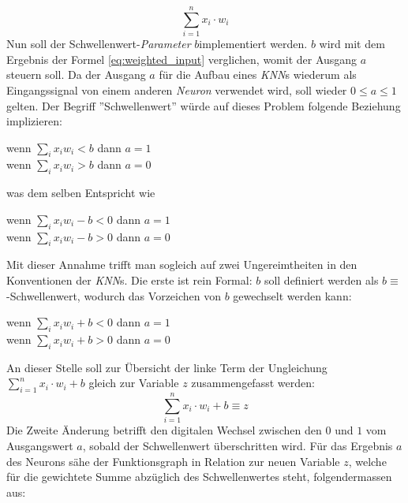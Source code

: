 \begin{equation}\label{eq:weighted_input}
	\sum_{i=1}^{n} x_i\cdot w_i
\end{equation}
Nun soll der Schwellenwert-\textit{Parameter} $b$\footnotemark[\value{footnote}]  implementiert werden. $b$ wird mit dem Ergebnis der Formel \ref{eq:weighted_input} verglichen, womit der Ausgang $a$ steuern soll. Da der Ausgang $a$ für die Aufbau eines \textit{KNN}s wiederum als Eingangssignal von einem anderen \textit{Neuron} verwendet wird, soll wieder $0\leq a \leq 1$ gelten. Der Begriff ''Schwellenwert'' würde auf dieses Problem folgende Beziehung implizieren:
\begin{center}
	\begin{minipage}{7cm}
		wenn $\sum_{i}x_iw_i < b$ dann $a=1$\\
		wenn $\sum_{i}x_iw_i > b$ dann $a=0$
	\end{minipage}
\end{center}
was dem selben Entspricht wie
\begin{center}
\begin{minipage}{7cm}
	wenn $\sum_{i}x_iw_i - b < 0$ dann $a=1$\\
	wenn $\sum_{i}x_iw_i - b > 0$ dann $a=0$
\end{minipage}
\end{center}
Mit dieser Annahme trifft man sogleich auf zwei Ungereimtheiten in den Konventionen der \textit{KNN}s. Die erste ist rein Formal: $b$ soll definiert werden als $b \equiv$ -Schwellenwert, wodurch das Vorzeichen von $b$ gewechselt werden kann:
\begin{center}
	\begin{minipage}{7cm}
		wenn $\sum_{i}x_iw_i + b < 0$ dann $a=1$\\
		wenn $\sum_{i}x_iw_i + b > 0$ dann $a=0$
	\end{minipage}
\end{center}
An dieser Stelle soll zur Übersicht der linke Term der Ungleichung $\sum_{i=1}^{n} x_i\cdot w_i+b$ gleich zur Variable $z$ zusammengefasst werden:
\begin{equation}\label{eq:def_z}
\sum_{i=1}^{n} x_i\cdot w_i+b\equiv z
\end{equation}
Die Zweite Änderung betrifft den digitalen Wechsel zwischen den $0$ und $1$ vom Ausgangswert $a$, sobald der Schwellenwert überschritten wird. Für das Ergebnis $a$ des Neurons sähe der Funktionsgraph in Relation zur neuen Variable $z$, welche für die gewichtete Summe abzüglich des Schwellenwertes steht, folgendermassen aus:

